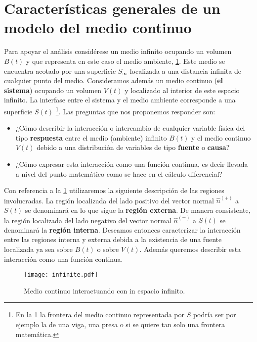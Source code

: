 \documentclass[../notas medios.tex]{subfiles}
\begin{document}
\section{Características generales de un modelo del medio continuo}
Para apoyar el análisis considérese un medio infinito ocupando un volumen $B(t)$
y que representa en este caso el medio ambiente, \cref{infinite}. Este medio se
encuentra acotado por una superficie ${S_\infty }$ localizada a una distancia infinita de cualquier punto del medio.  Consideramos además un medio continuo ({\bf el sistema}) ocupando un volumen $V(t)$ y localizado al interior de este espacio infinito.  La interfase entre el sistema y el medio ambiente corresponde a una superficie $S(t)$ \footnote{En la \cref{infinite} la frontera del medio continuo representada por $S$ podría ser por ejemplo la de una viga, una presa o si se quiere tan solo una frontera matemática.}. Las preguntas que nos proponemos responder son:

\begin{itemize}
\item ¿Cómo describir la interacción o intercambio de cualquier variable física
del tipo {\bf respuesta} entre el medio (ambiente) infinito  $B(t)$ y el medio continuo $V(t)$ debido a una distribución de variables de tipo {\bf fuente} o {\bf causa}?
\item ¿Cómo expresar esta interacción como una función continua, es decir
llevada a nivel del punto matemático como se hace en el cálculo diferencial?
\end{itemize}

Con referencia a la \cref{infinite} utilizaremos la siguiente descripción de las regiones involucradas.  La región localizada del lado positivo del vector normal ${\hat n^{( + )}}$ a $S(t)$ se denominará en lo que sigue la {\bf región externa}.  De manera consistente, la región localizada del lado negativo del vector normal ${\hat n^{( - )}}$ a $S(t)$ se denominará la {\bf región interna}.  Deseamos entonces caracterizar la interacción entre las regiones interna y externa debida a la existencia de una fuente localizada ya sea sobre $B(t)$ o sobre  $V(t)$. Además queremos describir esta interacción como una función continua.


\begin{figure}[H]
\centering
	\texttt{[image: infinite.pdf]}
	\caption{Medio continuo interactuando con in espacio infinito.}
	\label{infinite}
\end{figure}
\end{document}
